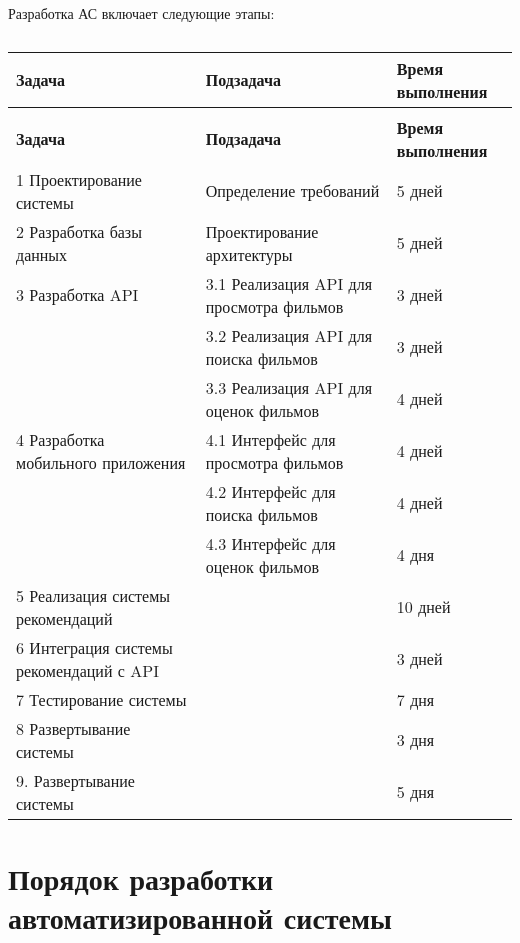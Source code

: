 Разработка АС включает следующие этапы:

\begin{longtable}{|p{6cm}|p{5cm}|p{4cm}|}
	\caption{} \label{table:stages} \\
	\hline
	\textbf{Задача}
	& \textbf{Подзадача}
	& \textbf{Время выполнения} \\
	\hline
	\endfirsthead
	\conttable{table:stages} \\
	\hline
	\textbf{Задача}
	& \textbf{Подзадача}
	& \textbf{Время выполнения} \\
	\hline
	\endhead
	1 Проектирование системы
	& Определение требований
	& 5 дней \\ \hline

	2 Разработка базы данных
	& Проектирование архитектуры
	& 5 дней \\ \hline

	3 Разработка API
	& 3.1 Реализация API для просмотра фильмов
	& 3 дней \\ \hline

	& 3.2 Реализация API для поиска фильмов
	& 3 дней \\ \hline

	& 3.3 Реализация API для оценок фильмов
	& 4 дней \\ \hline

	4 Разработка мобильного приложения
	& 4.1 Интерфейс для просмотра фильмов
	& 4 дней \\ \hline

	& 4.2 Интерфейс для поиска фильмов
	& 4 дней \\ \hline

	& 4.3 Интерфейс для оценок фильмов
	& 4 дня \\ \hline

	5 Реализация системы рекомендаций
	&
	& 10 дней \\ \hline

	6 Интеграция системы рекомендаций с API
	&
	& 3 дней \\ \hline

	7 Тестирование системы
	&
	& 7 дня \\ \hline

	8 Развертывание системы
	&
	& 3 дня \\ \hline

	9. Развертывание системы
	&
	& 5 дня \\ \hline
\end{longtable}

\section{Порядок разработки автоматизированной системы}

